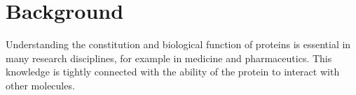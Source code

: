 \documentclass{bmcart}
\begin{document}
\begin{frontmatter}
\begin{abstractbox}
\begin{keyword}
\end{keyword}


\end{abstractbox}
%

\end{frontmatter}



\section*{Background}
Understanding the constitution and biological function of proteins is essential in many research disciplines, for example in medicine and pharmaceutics.
This knowledge is tightly connected with the ability of the protein to interact with other molecules.
\end{document}
